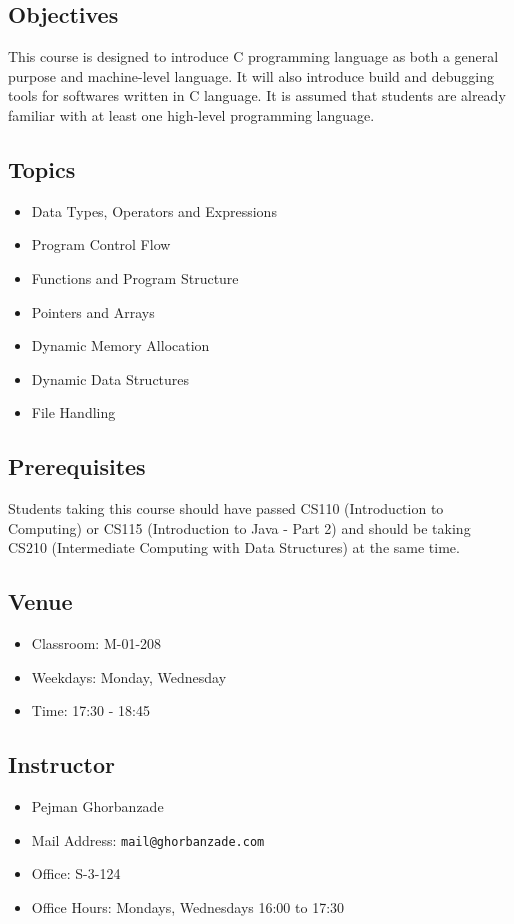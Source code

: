 \documentclass[12pt,letterpaper,twoside]{article}
\begin{document}


\subsection*{Objectives}
This course is designed to introduce C programming language as both a general purpose and machine-level language.
It will also introduce build and debugging tools for softwares written in C language.
It is assumed that students are already familiar with at least one high-level programming language.

\subsection*{Topics}
\begin{itemize}
\item[] Data Types, Operators and Expressions
\item[] Program Control Flow
\item[] Functions and Program Structure
\item[] Pointers and Arrays
\item[] Dynamic Memory Allocation
\item[] Dynamic Data Structures
\item[] File Handling
\end{itemize}

\subsection*{Prerequisites}
Students taking this course should have passed CS110 (Introduction to Computing) or CS115 (Introduction to Java - Part 2) and should be taking CS210 (Intermediate Computing with Data Structures) at the same time.

\subsection*{Venue}
\begin{itemize}
\item[] Classroom: M-01-208
\item[] Weekdays: Monday, Wednesday
\item[] Time: 17:30 - 18:45
\end{itemize}

\subsection*{Instructor}
\begin{itemize}
\item[] Pejman Ghorbanzade
\item[] Mail Address: \texttt{mail@ghorbanzade.com}
\item[] Office: S-3-124
\item[] Office Hours: Mondays, Wednesdays 16:00 to 17:30
\end{itemize}
\end{document}
